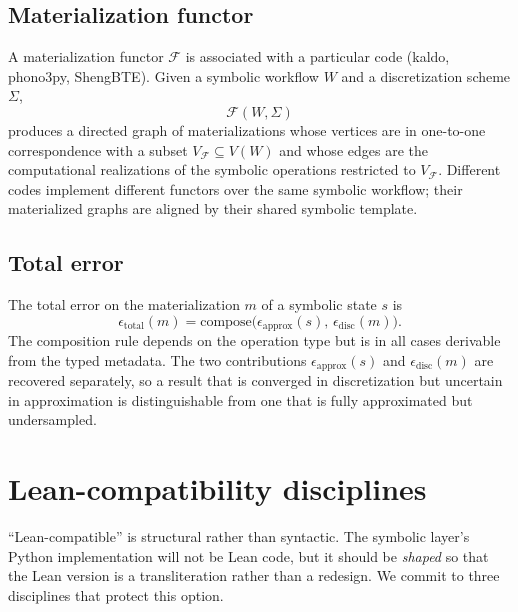 \documentclass[11pt,a4paper]{article}
\begin{document}
\subsection{Materialization functor}

A materialization functor $\mathcal{F}$ is associated with a particular code (kaldo, phono3py,
ShengBTE). Given a symbolic workflow $W$ and a discretization scheme $\Sigma$,
\begin{equation}
  \mathcal{F}(W, \Sigma)
\end{equation}
produces a directed graph of materializations whose vertices are in one-to-one correspondence
with a subset $V_{\mathcal{F}} \subseteq V(W)$ and whose edges are the computational realizations
of the symbolic operations restricted to $V_{\mathcal{F}}$. Different codes implement different
functors over the same symbolic workflow; their materialized graphs are aligned by their shared
symbolic template.

\subsection{Total error}

The total error on the materialization $m$ of a symbolic state $s$ is
\begin{equation}
  \epsilon_{\text{total}}(m)
  = \mathrm{compose}\bigl(\epsilon_{\text{approx}}(s),\, \epsilon_{\text{disc}}(m)\bigr).
\end{equation}
The composition rule depends on the operation type but is in all cases derivable from the
typed metadata. The two contributions $\epsilon_{\text{approx}}(s)$ and
$\epsilon_{\text{disc}}(m)$ are recovered separately, so a result that is converged in
discretization but uncertain in approximation is distinguishable from one that is fully
approximated but undersampled.


\section{Lean-compatibility disciplines}
\label{sec:lean-disciplines}

``Lean-compatible'' is structural rather than syntactic. The symbolic layer's Python implementation
will not be Lean code, but it should be \emph{shaped} so that the Lean version is a
transliteration rather than a redesign. We commit to three disciplines that protect this option.
\end{document}
